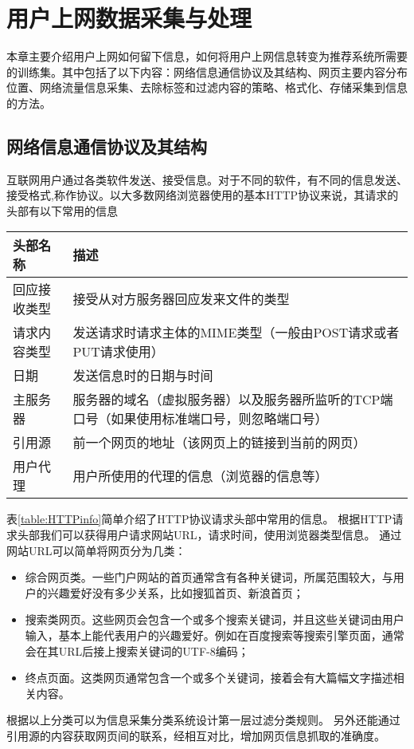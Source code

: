 \chapter{用户上网数据采集与处理}
本章主要介绍用户上网如何留下信息，如何将用户上网信息转变为推荐系统所需要的训练集。其中包括了以下内容：网络信息通信协议及其结构、网页主要内容分布位置、网络流量信息采集、去除标签和过滤内容的策略、格式化、存储采集到信息的方法。

\section{网络信息通信协议及其结构}
互联网用户通过各类软件发送、接受信息。对于不同的软件，有不同的信息发送、接受格式,称作协议。以大多数网络浏览器使用的基本HTTP协议来说，其请求的头部有以下常用的信息 \\
\begin{center}
\label{table:HTTPinfo}
\begin{tabular}{l|p{10cm}}
 \hline
头部名称 & 描述 \\ \hline
回应接收类型 & 接受从对方服务器回应发来文件的类型 \\ \hline
请求内容类型 & 发送请求时请求主体的MIME类型（一般由POST请求或者PUT请求使用） \\ \hline
日期 & 发送信息时的日期与时间 \\ \hline
主服务器 & 服务器的域名（虚拟服务器）以及服务器所监听的TCP端口号（如果使用标准端口号，则忽略端口号） \\ \hline
引用源 & 前一个网页的地址（该网页上的链接到当前的网页） \\ \hline
用户代理 & 用户所使用的代理的信息（浏览器的信息等） \\
\hline
\end{tabular}
\end{center}

表\ref{table:HTTPinfo}简单介绍了HTTP协议请求头部中常用的信息。
根据HTTP请求头部我们可以获得用户请求网站URL，请求时间，使用浏览器类型信息。
通过网站URL可以简单将网页分为几类：
\begin{itemize}
\item 综合网页类。一些门户网站的首页通常含有各种关键词，所属范围较大，与用户的兴趣爱好没有多少关系，比如搜狐首页、新浪首页；
\item 搜索类网页。这些网页会包含一个或多个搜索关键词，并且这些关键词由用户输入，基本上能代表用户的兴趣爱好。例如在百度搜索等搜索引擎页面，通常会在其URL后接上搜索关键词的UTF-8编码；
\item 终点页面。这类网页通常包含一个或多个关键词，接着会有大篇幅文字描述相关内容。
\end{itemize}
根据以上分类可以为信息采集分类系统设计第一层过滤分类规则。
另外还能通过引用源的内容获取网页间的联系，经相互对比，增加网页信息抓取的准确度。


